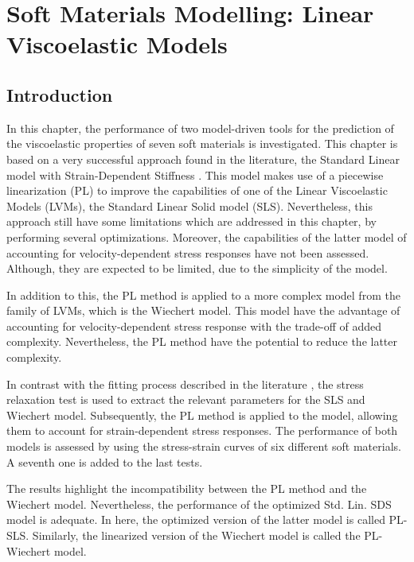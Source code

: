 \chapter{Soft Materials Modelling: Linear Viscoelastic Models} \label{sec:ChapterModellingLVM}


\section{Introduction}

In this chapter, the performance of two model-driven tools for the prediction of the viscoelastic properties of seven soft materials is investigated. This chapter is based on a very successful approach found in the literature, the Standard Linear model with Strain-Dependent Stiffness \cite{austin2015control}. This model makes use of a piecewise linearization (PL) to improve the capabilities of one of the Linear Viscoelastic Models (LVMs), the Standard Linear Solid model (SLS). Nevertheless, this approach still have some limitations which are addressed in this chapter, by performing several optimizations. Moreover, the capabilities of the latter model of accounting for velocity-dependent stress responses have not been assessed. Although, they are expected to be limited, due to the simplicity of the model.

In addition to this, the PL method is applied to a more complex model from the family of LVMs, which is the Wiechert model. This model have the advantage of accounting for velocity-dependent stress response with the trade-off of added complexity. Nevertheless, the PL method have the potential to reduce the latter complexity.

In contrast with the fitting process described in the literature \cite{austin2015control}, the stress relaxation test is used to extract the relevant parameters for the SLS and Wiechert model. Subsequently, the PL method is applied to the model, allowing them to account for strain-dependent stress responses. The performance of both models is assessed by using the stress-strain curves of six different soft materials. A seventh one is added to the last tests.

The results highlight the incompatibility between the PL method and the Wiechert model. Nevertheless, the performance of the optimized Std. Lin. SDS model is adequate. In here, the optimized version of the latter model is called PL-SLS. Similarly, the linearized version of the Wiechert model is called the PL-Wiechert model.

